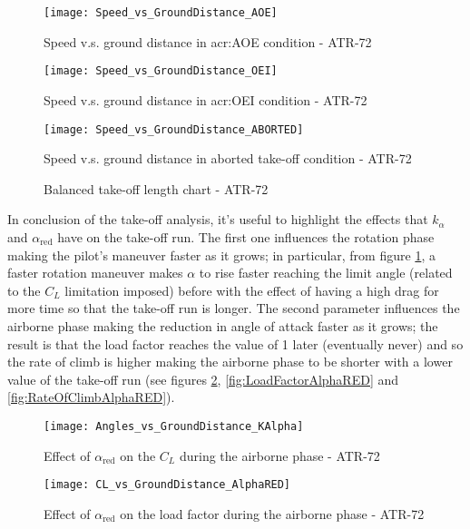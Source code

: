 %
\begin{figure}[H]
\centering
\texttt{[image: Speed\_vs\_GroundDistance\_AOE]}
\caption{Speed v.s. ground distance in \gls{acr:AOE} condition - ATR-72}
\end{figure}
%
\begin{figure}[H]
\centering
\texttt{[image: Speed\_vs\_GroundDistance\_OEI]}
\caption{Speed v.s. ground distance in \gls{acr:OEI} condition - ATR-72}
\end{figure}
%
\begin{figure}[H]
\centering
\texttt{[image: Speed\_vs\_GroundDistance\_ABORTED]}
\caption{Speed v.s. ground distance in aborted take-off condition - ATR-72}
\end{figure}
%
\begin{figure}[H]
\centering

\caption{Balanced take-off length chart - ATR-72}
\end{figure}
%
\noindent
In conclusion of the take-off analysis, it's useful to highlight the effects that $k_{\alpha}$ and $\alpha_{\text{red}}$ have on the take-off run. The first one influences the rotation phase making the pilot's maneuver faster as it grows; in particular, from figure \ref{fig:kAlphaEffects}, a faster rotation maneuver makes $\alpha$ to rise faster reaching the limit angle (related to the $C_L$ limitation imposed) before with the effect of having a high drag for more time so that the take-off run is longer. The second parameter influences the airborne phase making the reduction in angle of attack faster as it grows; the result is that the load factor reaches the value of 1 later (eventually never) and so the rate of climb is higher making the airborne phase to be shorter with a lower value of the take-off run (see figures \ref{fig:CLAlphaRED}, \ref{fig:LoadFactorAlphaRED} and \ref{fig:RateOfClimbAlphaRED}).
%
\begin{figure}[!b]
\centering
\texttt{[image: Angles\_vs\_GroundDistance\_KAlpha]}
\caption{Effect of $\alpha_{\text{red}}$ on the $C_L$ during the airborne phase - ATR-72}
\label{fig:kAlphaEffects}
\end{figure}
%
\begin{figure}[H]
\centering
\texttt{[image: CL\_vs\_GroundDistance\_AlphaRED]}
\caption{Effect of $\alpha_{\text{red}}$ on the load factor during the airborne phase - ATR-72}
\label{fig:CLAlphaRED}
\end{figure}
